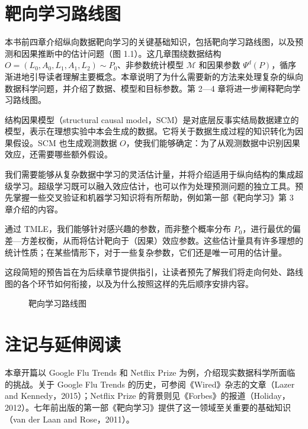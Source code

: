 \section{靶向学习路线图}
\label{sec:ch01-roadmap}

本书前四章介绍纵向数据靶向学习的关键基础知识，包括靶向学习路线图，以及预测和因果推断中的估计问题（图 1.1）。这几章围绕数据结构 $O=(L_0,A_0,L_1,A_1,L_2)\sim P_0$、非参数统计模型 $\mathcal M$ 和因果参数 $\Psi^d(P)$，循序渐进地引导读者理解主要概念。本章说明了为什么需要新的方法来处理复杂的纵向数据科学问题，并介绍了数据、模型和目标参数。第 2—4 章将进一步阐释靶向学习路线图。

\begin{description}[leftmargin=0em,labelindent=0em,itemindent=0em,style=nextline,itemsep=.6em]
 \item[定义模型和目标参数。]
 结构因果模型（structural causal model，SCM）是对底层反事实结局数据建立的模型，表示在理想实验中本会生成的数据。它将关于数据生成过程的知识转化为因果假设。SCM 也生成观测数据 $O$，使我们能够确定：为了从观测数据中识别因果效应，还需要哪些额外假设。
 \item[用于预测的超级学习。]
 我们需要能够从复杂数据中学习的灵活估计量，并将介绍适用于纵向结构的集成超级学习。超级学习既可以融入效应估计，也可以作为处理预测问题的独立工具。预先掌握一些交叉验证和机器学习知识将有所帮助，例如第一部《靶向学习》第 3 章介绍的内容。
 \item[TMLE。]
 通过 TMLE，我们能够针对感兴趣的参数，而非整个概率分布 $P_0$，进行最优的偏差—方差权衡，从而将估计靶向于（因果）效应参数。这些估计量具有许多理想的统计性质；在某些情形下，对于一些复杂参数，它们还是唯一可用的估计量。
\end{description}

这段简短的预告旨在为后续章节提供指引，让读者预先了解我们将走向何处、路线图的各个环节如何衔接，以及为什么按照这样的先后顺序安排内容。

\begin{figure}[p]
 \centering
 
 \caption{靶向学习路线图}
 \label{fig:ch01-roadmap}
\end{figure}
\FloatBarrier

\section{注记与延伸阅读}
\label{sec:ch01-notes}

本章开篇以 Google Flu Trends 和 Netflix Prize 为例，介绍现实数据科学所面临的挑战。关于 Google Flu Trends 的历史，可参阅《Wired》杂志的文章（Lazer and Kennedy，2015）；Netflix Prize 的背景则见《Forbes》的报道（Holiday，2012）。七年前出版的第一部《靶向学习》提供了这一领域至关重要的基础知识（van der Laan and Rose，2011）。

